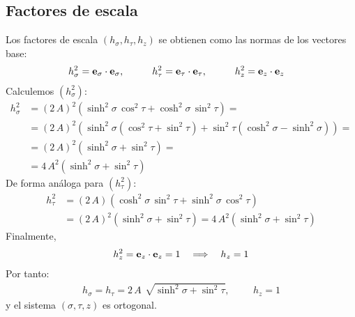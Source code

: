 \documentclass[12pt]{article}
\begin{document}
\subsection*{Factores de escala}
Los factores de escala $(h_{\sigma}, h_{\tau}, h_{z})$ se obtienen como las normas de los vectores base:
\begin{align*}
h_{\sigma}^{2} &= \vb{e}_{\sigma} \cdot \vb{e}_{\sigma}, \hspace{1cm} h_{\tau}^{2} = \vb{e}_{\tau} \cdot \vb{e}_{\tau}, \hspace{1cm} 
h_{z}^{2} = \vb{e}_{z} \cdot \vb{e}_{z}
\end{align*}
Calculemos $(h_{\sigma}^{2})$:
\begin{align*}
h_{\sigma}^{2} &= (2\, A)^{2} \left( \sinh^{2} \sigma \, \cos^{2} \tau + \cosh^{2} \sigma \, \sin^{2} \tau \right) = \\[4pt]
&= (2 \, A)^{2} \left( \sinh^{2} \sigma (\cos^{2} \tau + \sin^{2} \tau) + \sin^{2} \tau (\cosh^{2} \sigma - \sinh^{2} \sigma) \right) =\\[4pt]
&= (2 \, A)^{2} \left( \sinh^{2} \sigma + \sin^{2} \tau \right) = \\[4pt]
&= 4\, A^{2} \left( \sinh^{2} \sigma + \sin^{2} \tau \right)
\end{align*}
De forma análoga para $(h_{\tau}^{2})$:
\begin{align*}
h_{\tau}^{2} &=(2 \, A)^{ } \left( \cosh^{2} \sigma \, \sin^{2} \tau + \sinh^{2} \sigma \, \cos^{2} \tau \right) \\[1em]
&= (2\, A)^{2} \left( \sinh^{2} \sigma + \sin^{2} \tau \right) = 4\, A^{2} \left( \sinh^{2} \sigma + \sin^{2} \tau \right)
\end{align*}
Finalmente,
\begin{align*}
h_{z}^{2} = \vb{e}_{z} \cdot \vb{e}_{z} = 1 \quad \Longrightarrow \quad h_{z} = 1
\end{align*}
\bigskip
\noindent Por tanto:
\begin{align*}
\boxed{h_{\sigma} = h_{\tau} = 2\, A\ \, \sqrt{\sinh^{2} \sigma + \sin^{2} \tau}, \hspace{1cm} h_{z} = 1}
\end{align*}
y el sistema $(\sigma, \tau, z)$ es ortogonal.
\end{document}
